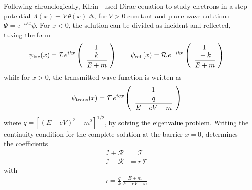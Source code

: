 Following chronologically, Klein~\cite{Klein1929} used Dirac equation to study electrons in a step potential $A(x) = V\,\theta(x) ~\dd t$, for $V>0$ constant and plane wave solutions $\Psi= e^{-i E t} \psi$. For $x<0$, the solution can be divided as incident and reflected, taking the form
\begin{align}
    \psi_\mathrm{inc}(x) = \mathcal{I}\, e^{i k x} \left(\begin{array}{c} 1 \\ \cfrac{k}{E+m} \end{array}\right) \qquad
    \psi_\mathrm{refl}(x) = \mathcal{R}\, e^{- i k x} \left(\begin{array}{c} 1 \\ \cfrac{-k}{E+m} \end{array}\right)
\end{align}
while for $x>0$, the transmitted wave function is written as 
\begin{align}
    \psi_\mathrm{trans}(x) = \mathcal{T}\, e^{i q x} \left(\begin{array}{c} 1 \\ \cfrac{q}{ E - e V + m} \end{array}\right)
\end{align}
where $q = [(E-e V)^2 - m^2]^{1/2}$, by solving the eigenvalue problem. 
Writing the continuity condition for the complete solution at the barrier $x=0$, determines the coefficients
\begin{align}
    \mathcal{I} + \mathcal{R} &= \mathcal{T} \\
    \mathcal{I} - \mathcal{R} &= r\, \mathcal{T}
\end{align}
with
\begin{align}
    r = \frac{q}{k}\,\frac{E+m}{E-e V+m}
\end{align}